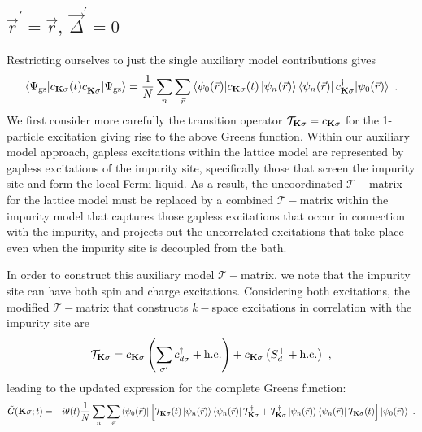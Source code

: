 \documentclass[reprint,hidelinks,onecolumn]{revtex4-2}
\begin{document}
\subsection{\(\vec r^\prime = \vec r,~\vec\Delta^\prime=0\)}
Restricting ourselves to just the single auxiliary model contributions gives
\begin{equation}\begin{aligned}
		\braket{\Psi_\text{gs} | c_{{\bf K}\sigma}(t) c^\dagger_{{\bf K}\sigma} | \Psi_\text{gs}} = \frac{1}{N}\sum_n\sum_{\vec r} \braket{\psi_{0}(\vec r) | c_{{\bf K}\sigma}(t) \ket{\psi_n(\vec r)}\bra{\psi_n(\vec r)} c^\dagger_{{\bf K}\sigma} | \psi_{0}(\vec r)} ~.
\end{aligned}\end{equation}
We first consider more carefully the transition operator \(\mathcal{T}_{{\bf K}\sigma} = c_{{\bf K}\sigma}\) for the 1-particle excitation giving rise to the above Greens function. Within our auxiliary model approach, gapless excitations within the lattice model are represented by gapless excitations of the impurity site, specifically those that screen the impurity site and form the local Fermi liquid. As a result, the uncoordinated \(\mathcal{T}-\)matrix for the lattice model must be replaced by a combined \(\mathcal{T}-\)matrix within the impurity model that captures those gapless excitations that occur in connection with the impurity, and projects out the uncorrelated excitations that take place even when the impurity site is decoupled from the bath.

In order to construct this auxiliary model \(\mathcal{T}-\)matrix, we note that the impurity site can have both spin and charge excitations. Considering both excitations, the modified \(\mathcal{T}-\)matrix that constructs \(k-\)space excitations in correlation with the impurity site are
\begin{equation}\begin{aligned}\label{tmatrix}
	\mathcal{T}_{{\bf K}\sigma} = c_{{\bf K}\sigma}\left(\sum_{\sigma^\prime}c^\dagger_{d\sigma} + \text{h.c.}\right) + c_{{\bf K}\sigma}\left(S_d^+ + \text{h.c.}\right)~,
\end{aligned}\end{equation}
leading to the updated expression for the complete Greens function:
\begin{equation}\begin{aligned}
	\tilde G({\bf K}\sigma; t) = -i\theta(t)\frac{1}{N}\sum_n\sum_{\vec r} \braket{\psi_{0}(\vec r) | \left[\mathcal{T}_{{\bf K}\sigma}(t) \ket{\psi_n(\vec r)}\bra{\psi_n(\vec r)} \mathcal{T}_{{\bf K}\sigma}^\dagger + \mathcal{T}^\dagger_{{\bf K}\sigma} \ket{\psi_n(\vec r)}\bra{\psi_n(\vec r)} \mathcal{T}_{{\bf K}\sigma}(t)\right] | \psi_{0}(\vec r)} ~.
\end{aligned}\end{equation}
\end{document}
